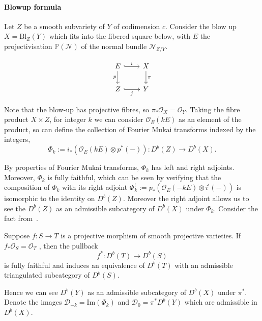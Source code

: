 
\paragraph*{Blowup formula}

Let $Z$ be a smooth subvariety of $Y$ of codimension $c$. Consider the blow up $X = \mathrm{Bl}_{Z}(Y)$ which fits into the fibered square below, with $E$ the projectivisation $\mathbb{P} (\mathcal{N})$ of the normal bundle $\mathcal{N}_{Z/Y}$.

\[\begin{tikzcd}[column sep=2.25em]
	{E } & X \\
	Z & {Y}
	\arrow["p"', from=1-1, to=2-1]
	\arrow["\pi", from=1-2, to=2-2]
	\arrow["i", hook, from=1-1, to=1-2]
	\arrow["j"', hook, from=2-1, to=2-2]
\end{tikzcd}\]

Note that the blow-up has projective fibres, so $\pi_{*}\mathcal{O}_{X}= \mathcal{O}_Y$. Taking the fibre product $X \times Z$, for integer $k$ we can consider $\mathcal{O}_{E}(kE)$ as an element of the product, so can define the collection of Fourier Mukai transforms indexed by the integers, $$\Phi_{k}:= i_{*}\left( \mathcal{O}_{E}(kE)\otimes p^{*}(- ) \right): D^b(Z)\to D^b(X).$$

By properties of Fourier Mukai transforms, $\Phi_k$ has left and right adjoints. Moreover, $\Phi_k$ is fully faithful, which can be seen by verifying that the composition of $\Phi_k$ with its right adjoint $\Phi_{k}^{!}:= p_{*}(\mathcal{O}_{E}(-kE)\otimes i^{!}(-))$ is isomorphic to the identity on $D^b(Z)$. Moreover the right adjoint allows us to see the $D^b(Z)$ as an admissible subcategory of $D^b(X)$ under $\Phi_k$. Consider the fact from~\cite*{Huybrechts}.

\begin{proposition}[label=prop:ffpullback]{\cite*{Huybrechts}}{}
    Suppose $f: S \to T$ is a projective morphism of smooth projective varieties. If $f_{*}\mathcal{O}_{S} = \mathcal{O}_T$ , then the pullback $$f^{*}: D^b(T)\to D^b(S)$$is fully faithful and induces an equivalence of $D^b(T)$ with an admissible triangulated subcategory of $D^b(S)$.
\end{proposition}

Hence we can see $D^b(Y)$ as an admissible subcategory of $D^b(X)$ under $\pi^*$. Denote the images $\mathcal{D}_{-k}=\mathrm{Im}(\Phi_{k})$ and $\mathcal{D}_{0}= \pi^{*}D^b(Y)$ which are admissible in $D^b(X)$.

